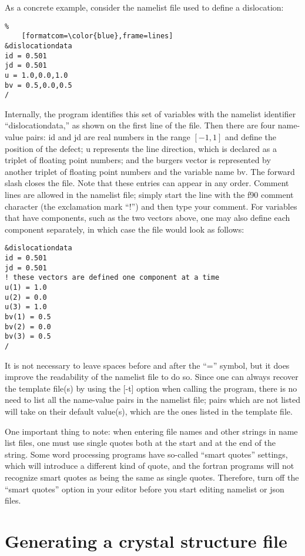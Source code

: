 \documentclass[DIV=calc, paper=letter, fontsize=11pt]{scrartcl}	 %
\begin{document}
As a concrete example, consider the namelist file used to define a dislocation:
\begin{Verbatim}%
	[formatcom=\color{blue},frame=lines]
&dislocationdata
id = 0.501
jd = 0.501
u = 1.0,0.0,1.0
bv = 0.5,0.0,0.5
/
\end{Verbatim}
Internally, the program identifies this set of variables with the namelist identifier ``dislocationdata,'' as shown on the first line of the file.
Then there are four name-value pairs: \textsf{id} and \textsf{jd} are real numbers in the range $[-1,1]$ and define the position
of the defect; \textsf{u} represents the line direction, which is declared as a triplet of 
floating point numbers; and the burgers vector is represented by another triplet of floating point numbers and the variable name \textsf{bv}.
The forward slash closes the file.  Note that these entries can appear in any order. Comment lines are allowed in the namelist
file; simply start the line with the f90 comment character (the exclamation mark ``!'') and then type your comment.  For variables that 
have components, such as the two vectors above, one may also define each component separately, in which case the file would look
as follows:
\begin{verbatim}
&dislocationdata
id = 0.501
jd = 0.501
! these vectors are defined one component at a time
u(1) = 1.0 
u(2) = 0.0 
u(3) = 1.0
bv(1) = 0.5
bv(2) = 0.0
bv(3) = 0.5
/
\end{verbatim}
It is not necessary to leave spaces before and after the ``='' symbol, but it does improve the readability of the namelist file to do so. Since 
one can always recover the template file(s) by using the [-t] option when calling the program, there is no need to list all the name-value pairs
in the namelist file; pairs which are not listed will take on their default value(s), which are the ones listed in the template file.

One important thing to note: when entering file names and other strings in name list files, one must use single quotes both at the start and at 
the end of the string.  Some word processing programs have so-called ``smart quotes'' settings, which will introduce a different kind of quote,
and the fortran programs will not recognize smart quotes as being the same as single quotes.  Therefore, turn off the ``smart quotes'' option
in your editor before you start editing namelist or json files.

\newpage
\section{Generating a crystal structure file\label{sec:f90input5}}
\end{document}

